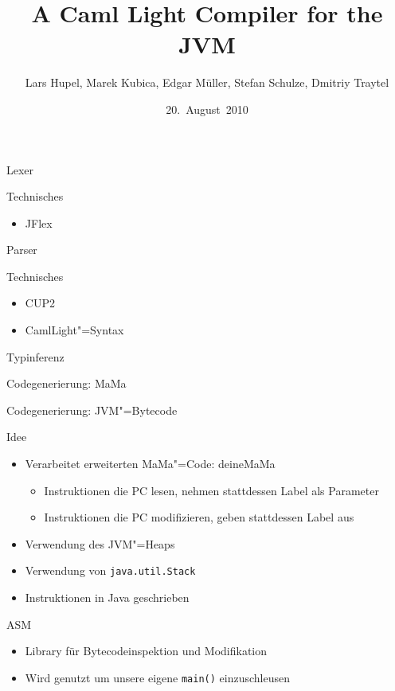 \documentclass[hyperref={pdfpagelabels=false}]{beamer}
\title{A Caml Light Compiler for the JVM}
\author[Hupel, Kubica, Müller, Schulze, Traytel]{Lars Hupel, Marek Kubica, Edgar Müller, Stefan Schulze, Dmitriy Traytel}
\institute{TU München}
\date{20.~August~2010}
\begin{document}
\frame{\titlepage}


\begin{frame}{Lexer}
  \begin{block}{Technisches}
    \begin{itemize}
      \item JFlex
    \end{itemize}
  \end{block}
\end{frame}

\begin{frame}{Parser}
  \begin{block}{Technisches}
    \begin{itemize}
      \item CUP2
      \item CamlLight"=Syntax
    \end{itemize}
  \end{block}
\end{frame}

\begin{frame}{Typinferenz}
\end{frame}

\begin{frame}{Codegenerierung: MaMa}
\end{frame}

\begin{frame}{Codegenerierung: JVM"=Bytecode}
  \begin{block}{Idee}
    \begin{itemize}
      \item Verarbeitet erweiterten MaMa"=Code: deineMaMa
        \begin{itemize}
          \item Instruktionen die PC lesen, nehmen stattdessen Label als Parameter
          \item Instruktionen die PC modifizieren, geben stattdessen Label aus
        \end{itemize}
      \item Verwendung des JVM"=Heaps
      \item Verwendung von \texttt{java.util.Stack}
      \item Instruktionen in Java geschrieben
    \end{itemize}
  \end{block}
  \begin{block}{ASM}
    \begin{itemize}
      \item Library für Bytecodeinspektion und Modifikation
      \item Wird genutzt um unsere eigene \texttt{main()} einzuschleusen
    \end{itemize}
  \end{block}
\end{frame}
\end{document}
